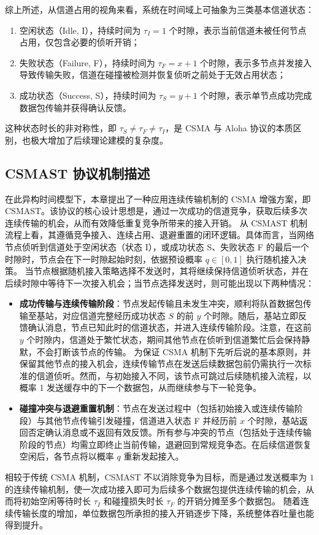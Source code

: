 综上所述，从信道占用的视角来看，系统在时间域上可抽象为三类基本信道状态：
\begin{enumerate}
	\item 空闲状态（Idle, I），持续时间为 $\tau_I = 1$ 个时隙，表示当前信道未被任何节点占用，仅包含必要的侦听开销；
	\item 失败状态（Failure, F），持续时间为 $\tau_F = x + 1$ 个时隙，表示多节点并发接入导致传输失败，信道在碰撞被检测并恢复侦听之前处于无效占用状态；
	\item 成功状态（Success, S），持续时间为 $\tau_S = y + 1$ 个时隙，表示单节点成功完成数据包传输并获得确认反馈。
\end{enumerate}
这种状态时长的非对称性，即 $\tau_S \neq \tau_F \neq \tau_I$，是 CSMA 与 Aloha 协议的本质区别，也极大增加了后续理论建模的复杂度。

\subsection{CSMAST 协议机制描述}

在此异构时间模型下，本章提出了一种应用连续传输机制的 CSMA 增强方案，即 CSMAST。该协议的核心设计思想是，通过一次成功的信道竞争，获取后续多次连续传输的机会，从而有效降低重复竞争所带来的接入开销。
从 CSMAST 机制流程上看，其遵循竞争接入、连续占用、退避重置的闭环逻辑。具体而言，当网络节点侦听到信道处于空闲状态（状态 I），或成功状态 S、失败状态 F 的最后一个时隙时，节点会在下一时隙起始时刻，依据预设概率 $q\in[0,1]$ 执行随机接入决策。
当节点根据随机接入策略选择不发送时，其将继续保持信道侦听状态，并在后续时隙中等待下一次接入机会；当节点选择发送时，则可能出现以下两种情况：
\begin{itemize}
	\item \textbf{成功传输与连续传输阶段}：节点发起传输且未发生冲突，顺利将队首数据包传输至基站，对应信道完整经历成功状态 $S$ 的前 $y$ 个时隙。随后，基站立即反馈确认消息，节点已知此时的信道状态，并进入连续传输阶段。注意，在这前 $y$ 个时隙内，信道处于繁忙状态，期间其他节点在侦听到信道繁忙后会保持静默，不会打断该节点的传输。
	为保证 CSMA 机制下先听后说的基本原则，并保留其他节点的接入机会，连续传输节点在发送后续数据包前仍需执行一次标准的信道侦听。然而，与初始接入不同，该节点可跳过后续随机接入流程，以概率 1 发送缓存中的下一个数据包，从而继续参与下一轮竞争。
	\item \textbf{碰撞冲突与退避重置机制}：节点在发送过程中（包括初始接入或连续传输阶段）与其他节点传输引发碰撞，信道进入状态 F 并经历前 $x$ 个时隙，基站返回否定确认消息或不返回有效反馈。所有参与冲突的节点（包括处于连续传输阶段的节点）均需立即终止当前传输，退避回到常规竞争态。在后续信道恢复空闲后，各节点将以概率 $q$ 重新发起接入。
\end{itemize}
相较于传统 CSMA 机制，CSMAST 不以消除竞争为目标，而是通过发送概率为 $1$ 的连续传输机制，使一次成功接入即可为后续多个数据包提供连续传输的机会，从而将初始空闲等待时长 $\tau_I$ 和碰撞损失时长 $\tau_F$ 的开销分摊至多个数据包。
随着连续传输长度的增加，单位数据包所承担的接入开销逐步下降，系统整体吞吐量也能得到提升。

